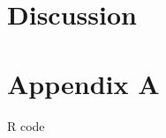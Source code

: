 \documentclass[a4paper,twoside, openright, 12pt, leqno]{article}
\begin{document}
\section{Discussion}




\section*{Appendix A}

R code 

\linespread{1}\normalsize

\small



\end{document}
